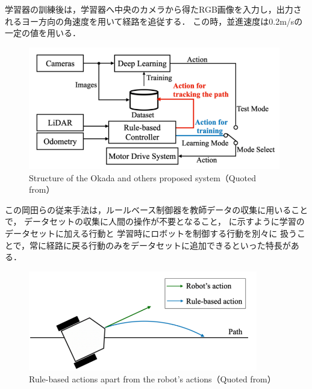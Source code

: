 学習器の訓練後は，学習器へ中央のカメラから得たRGB画像を入力し，出力されるヨー方向の角速度を用いて経路を追従する．
この時，並進速度は0.2m/sの一定の値を用いる．
\vspace{10zh}
\begin{figure}[htbp]
    \centering
     \includegraphics[width=110mm]{images/pdf/okada_method_sys.pdf}
     \caption[Structure of the Okada and others proposed system]{Structure of the Okada and others proposed system（Quoted from\cite{okada2020}）}
     \label{fig:okada_sys}
\end{figure}
\clearpage
この岡田らの従来手法は，ルールベース制御器を教師データの収集に用いることで，
データセットの収集に人間の操作が不要となること，
に示すように学習のデータセットに加える行動と
学習時にロボットを制御する行動を別々に
扱うことで，常に経路に戻る行動のみをデータセットに追加できるといった特長がある．
\begin{figure}[htbp]
    \centering
     \includegraphics[width=100mm]{images/pdf/robo_action.pdf}
     \caption[Rule-based actions
     apart from the robot's actions]{Rule-based actions
     apart from the robot's actions（Quoted from\cite{okada2020}）}
     \label{fig:robo_ac}
\end{figure}

